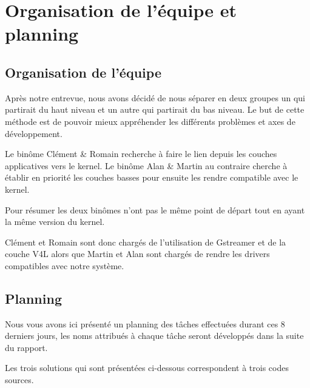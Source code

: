 
\chapter{Organisation de l'équipe et planning} %

\label{Chapter1} %


\section{Organisation de l'équipe}

Après notre entrevue, nous avons décidé de nous séparer en deux groupes un qui
partirait du haut niveau et un autre qui partirait du bas niveau. Le but de
cette méthode est de pouvoir mieux appréhender les différents problèmes et axes
de développement.

Le binôme Clément \& Romain recherche à faire le lien depuis
les couches applicatives vers le kernel. Le binôme Alan \& Martin au contraire
cherche à établir en priorité les couches basses pour ensuite les rendre
compatible avec le kernel.

Pour résumer les deux binômes n’ont pas le même point de départ tout en ayant la même version du kernel.

Clément et Romain sont donc chargés de l’utilisation de Gstreamer et de la
couche V4L alors que Martin et Alan sont chargés de rendre les drivers
compatibles avec notre système.

\section{Planning}

Nous vous avons ici présenté un planning des tâches effectuées durant ces 8 \\
derniers jours, les noms attribués à chaque tâche seront développés dans la suite du rapport.


Les trois solutions qui sont présentées ci-dessous correspondent à trois codes sources.

